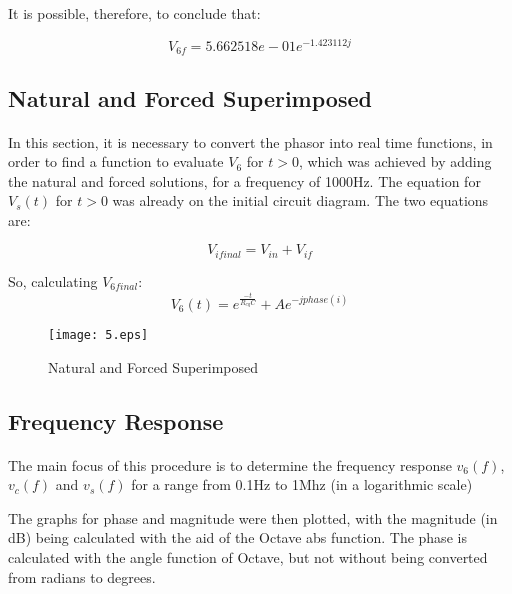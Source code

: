 It is possible, therefore, to conclude that:

\begin{equation}
	V_{6f} = 5.662518e-01 e^{-1.423112 j}
\end{equation}

\subsection{Natural and Forced Superimposed}
\paragraph{}

\par In this section, it is necessary to convert the phasor into real time functions, in order to find a function to evaluate $V_6$ for $t>0$, which was achieved by adding the natural and forced solutions, for a frequency of 1000Hz. The equation for $V_s(t)$ for $t>0$ was already on the initial circuit diagram. The two equations are:


\begin{equation}
	V_{ifinal} = V_{in} + V_{if}
\end{equation}

So, calculating $V_{6final}$:
\begin{equation}
	V_{6}(t) = e^{\frac{-t}{R_{eq} C}} + A e^{-j phase(i)}
\end{equation}

\begin{figure}[H]
    \texttt{[image: 5.eps]}
    \centering
    \caption{Natural and Forced Superimposed}
    \label{pha}
\end{figure}




\subsection{Frequency Response}
\paragraph{}

\par The main focus of this procedure is to determine the frequency response $v_6(f)$, $v_c(f)$ and $v_s(f)$ for a range from 0.1Hz to 1Mhz (in a logarithmic scale)
\par The graphs for phase and magnitude were then plotted, with the magnitude (in dB) being calculated with the aid of the Octave abs function. The phase is calculated with the angle function of Octave, but not without being converted from radians to degrees.

